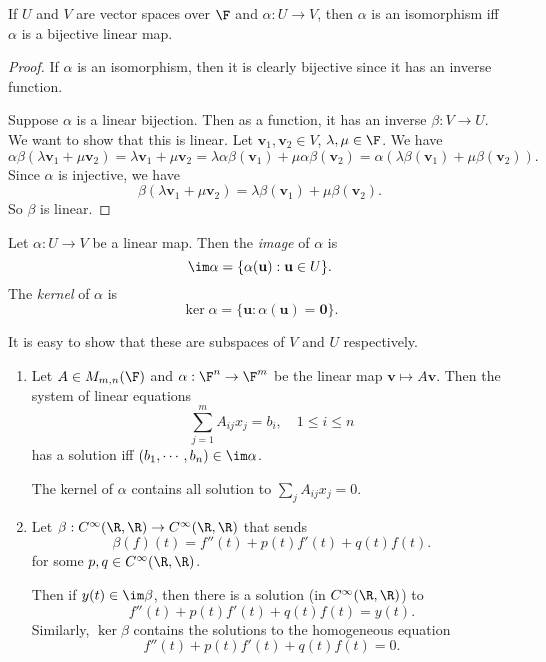 \documentclass[a4paper]{article}
\begin{document}
\begin{lemma}
  If $U$ and $V$ are vector spaces over $\F$ and $\alpha: U\to V$, then $\alpha$ is an isomorphism iff $\alpha$ is a bijective linear map.
\end{lemma}

\begin{proof}
  If $\alpha$ is an isomorphism, then it is clearly bijective since it has an inverse function.

  Suppose $\alpha$ is a linear bijection. Then as a function, it has an inverse $\beta: V\to U$. We want to show that this is linear. Let $\mathbf{v}_1, \mathbf{v}_2 \in V$, $\lambda, \mu \in \F$. We have
  \[
    \alpha \beta(\lambda \mathbf{v}_1 + \mu \mathbf{v}_2) = \lambda \mathbf{v}_1 + \mu \mathbf{v}_2 = \lambda \alpha \beta (\mathbf{v}_1) + \mu \alpha \beta (\mathbf{v}_2) = \alpha (\lambda \beta(\mathbf{v}_1) + \mu \beta (\mathbf{v}_2)).
  \]
  Since $\alpha$ is injective, we have
  \[
    \beta(\lambda \mathbf{v}_1 + \mu \mathbf{v}_2) = \lambda \beta (\mathbf{v}_1) + \mu \beta (\mathbf{v}_2).
  \]
  So $\beta$ is linear.
\end{proof}

\begin{defi}
  Let $\alpha: U\to V$ be a linear map. Then the \emph{image} of $\alpha$ is
  \[
    \im \alpha = \{\alpha (\mathbf{u}): \mathbf{u}\in U\}.
  \]
  The \emph{kernel} of $\alpha$ is
  \[
    \ker \alpha = \{\mathbf{u}: \alpha (\mathbf{u}) = \mathbf{0}\}.
  \]
\end{defi}
It is easy to show that these are subspaces of $V$ and $U$ respectively.

\begin{eg}\leavevmode
  \begin{enumerate}
    \item Let $A\in M_{m, n}(\F)$ and $\alpha: \F^n \to \F^m$ be the linear map $\mathbf{v}\mapsto A\mathbf{v}$. Then the system of linear equations
      \[
        \sum_{j = 1}^m A_{ij}x_j = b_i,\quad 1 \leq i \leq n
      \]
      has a solution iff $(b_1, \cdots, b_n) \in \im \alpha$.

      The kernel of $\alpha$ contains all solution to $\sum_j A_{ij}x_j = 0$.
    \item Let $\beta: C^{\infty}(\R, \R) \to C^{\infty}(\R, \R)$ that sends
      \[
        \beta(f)(t) = f''(t) + p(t) f'(t) + q(t) f(t).
      \]
      for some $p, q\in C^{\infty}(\R, \R)$.

      Then if $y(t) \in \im \beta$, then there is a solution (in $C^\infty (\R, \R)$) to
      \[
        f''(t) + p(t) f'(t) + q(t) f(t) = y(t).
      \]
      Similarly, $\ker \beta$ contains the solutions to the homogeneous equation
      \[
        f''(t) + p(t) f'(t) + q(t) f(t) = 0.
      \]
  \end{enumerate}
\end{eg}
\end{document}
